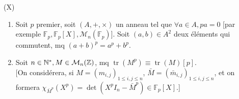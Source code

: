 
\begin{statementbox}
(X)
\begin{enumerate}
  \item Soit $p$ premier, soit $(A, +, \times)$ un anneau tel que $\forall a \in A, pa = 0$ [par exemple $\mathbb{F}_p, \mathbb{F}_p[X], \mathcal{M}_n(\mathbb{F}_p)$]. Soit $(a,b) \in A^2$ deux éléments qui commutent, mq $(a+b)^p = a^p + b^p$.
  \item Soit $n \in \mathbb N^*, M \in \mathcal{M}_n(\mathbb Z)$, mq $\operatorname{tr}(M^p) \equiv \operatorname{tr}(M) [p]$. \\
  $\big[$On considérera, si $M = (m_{i,j})_{1 \leq i,j \leq n}$, $\bar{M} = (\bar{m}_{i,j})_{1 \leq i,j \leq n}$, et on formera $\chi_{\bar{M}^p}(X^p) = \det(X^p I_n - \bar{M}^p) \in \mathbb{F}_p[X]$.\big]
\end{enumerate}
\end{statementbox}

